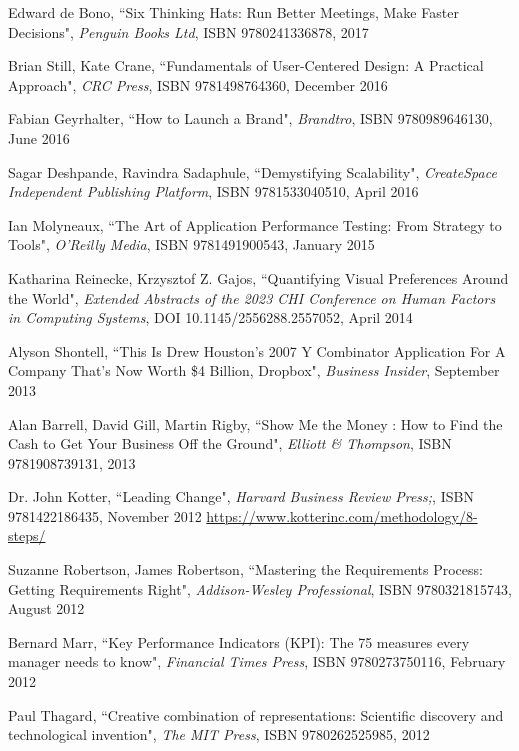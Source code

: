 \begin{thebibliography}{100}
 Edward de Bono, ``Six Thinking Hats: Run Better Meetings, Make Faster Decisions",
\emph{Penguin Books Ltd}, ISBN 9780241336878, 2017

 Brian Still, Kate Crane, ``Fundamentals of User-Centered Design: A Practical Approach", 
\emph{CRC Press}, ISBN 9781498764360, December 2016

 Fabian Geyrhalter, ``How to Launch a Brand", \emph{Brandtro}, ISBN 9780989646130, June 2016

 Sagar Deshpande, Ravindra Sadaphule, ``Demystifying Scalability", \emph{CreateSpace Independent 
Publishing Platform}, ISBN 9781533040510, April 2016

 Ian Molyneaux, ``The Art of Application Performance Testing: From Strategy to Tools", 
\emph{O'Reilly Media}, ISBN 9781491900543, January 2015

 Katharina Reinecke, Krzysztof Z. Gajos, ``Quantifying Visual Preferences Around the World", 
\emph{Extended Abstracts of the 2023 CHI Conference on Human Factors in Computing Systems}, DOI 10.1145/2556288.2557052, 
April 2014

 Alyson Shontell, ``This Is Drew Houston's 2007 Y Combinator Application For A Company 
That's Now Worth \$4 Billion, Dropbox", \emph{Business Insider}, September 2013

 Alan Barrell, David Gill, Martin Rigby, ``Show Me the Money : How to Find the Cash to Get Your 
Business Off the Ground", \emph{Elliott \& Thompson}, ISBN 9781908739131, 2013

 Dr. John Kotter, ``Leading Change", \emph{Harvard Business Review Press;}, 
ISBN 9781422186435, November 2012
\href{https://www.kotterinc.com/methodology/8-steps/}{https://www.kotterinc.com/methodology/8-steps/}

 Suzanne Robertson, James Robertson, ``Mastering the Requirements Process: Getting Requirements 
Right", \emph{Addison-Wesley Professional}, ISBN 9780321815743, August 2012

 Bernard Marr, ``Key Performance Indicators (KPI): The 75 measures every manager needs to know",
\emph{Financial Times Press}, ISBN 9780273750116, February 2012

 Paul Thagard, ``Creative combination of representations: Scientific discovery and 
technological invention", \emph{The MIT Press}, ISBN 9780262525985, 2012


\end{thebibliography}
